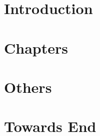 \section[Intro]{Introduction}


\section[Chpt]{Chapters}


\section[Oth]{Others}


\section[End]{Towards End}



